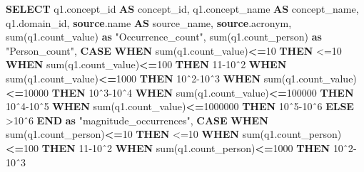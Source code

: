 \documentclass[
]{book}
\newenvironment{Shaded}{\begin{snugshade}}{\end{snugshade}}
\newcommand{\ControlFlowTok}[1]{\textcolor[rgb]{0.13,0.29,0.53}{\textbf{#1}}}
\newcommand{\DecValTok}[1]{\textcolor[rgb]{0.00,0.00,0.81}{#1}}
\newcommand{\FunctionTok}[1]{\textcolor[rgb]{0.00,0.00,0.00}{#1}}
\newcommand{\KeywordTok}[1]{\textcolor[rgb]{0.13,0.29,0.53}{\textbf{#1}}}
\newcommand{\NormalTok}[1]{#1}
\newcommand{\OperatorTok}[1]{\textcolor[rgb]{0.81,0.36,0.00}{\textbf{#1}}}
\newcommand{\OtherTok}[1]{\textcolor[rgb]{0.56,0.35,0.01}{#1}}
\newcommand{\StringTok}[1]{\textcolor[rgb]{0.31,0.60,0.02}{#1}}
\begin{document}
\begin{Shaded}
\begin{Highlighting}[]
\KeywordTok{SELECT}
\NormalTok{    q1.concept\_id }\KeywordTok{AS}\NormalTok{ concept\_id,}
\NormalTok{    q1.concept\_name }\KeywordTok{AS}\NormalTok{ concept\_name,}
\NormalTok{    q1.domain\_id,}
    \KeywordTok{source}\NormalTok{.name }\KeywordTok{AS}\NormalTok{ source\_name,}
    \KeywordTok{source}\NormalTok{.acronym,}
    \FunctionTok{sum}\NormalTok{(q1.count\_value) }\KeywordTok{as} \OtherTok{"Occurrence\_count"}\NormalTok{,}
    \FunctionTok{sum}\NormalTok{(q1.count\_person) }\KeywordTok{as} \OtherTok{"Person\_count"}\NormalTok{,}
    \ControlFlowTok{CASE} 
        \ControlFlowTok{WHEN} \FunctionTok{sum}\NormalTok{(q1.count\_value)}\OperatorTok{\textless{}=}\DecValTok{10} \ControlFlowTok{THEN} \StringTok{\textquotesingle{}\textless{}=10\textquotesingle{}}
        \ControlFlowTok{WHEN} \FunctionTok{sum}\NormalTok{(q1.count\_value)}\OperatorTok{\textless{}=}\DecValTok{100} \ControlFlowTok{THEN} \StringTok{\textquotesingle{}11{-}10ˆ2\textquotesingle{}}
        \ControlFlowTok{WHEN} \FunctionTok{sum}\NormalTok{(q1.count\_value)}\OperatorTok{\textless{}=}\DecValTok{1000} \ControlFlowTok{THEN} \StringTok{\textquotesingle{}10ˆ2{-}10ˆ3\textquotesingle{}}
        \ControlFlowTok{WHEN} \FunctionTok{sum}\NormalTok{(q1.count\_value)}\OperatorTok{\textless{}=}\DecValTok{10000} \ControlFlowTok{THEN} \StringTok{\textquotesingle{}10ˆ3{-}10ˆ4\textquotesingle{}}
        \ControlFlowTok{WHEN} \FunctionTok{sum}\NormalTok{(q1.count\_value)}\OperatorTok{\textless{}=}\DecValTok{100000} \ControlFlowTok{THEN} \StringTok{\textquotesingle{}10ˆ4{-}10ˆ5\textquotesingle{}}
        \ControlFlowTok{WHEN} \FunctionTok{sum}\NormalTok{(q1.count\_value)}\OperatorTok{\textless{}=}\DecValTok{1000000} \ControlFlowTok{THEN} \StringTok{\textquotesingle{}10ˆ5{-}10ˆ6\textquotesingle{}}
        \ControlFlowTok{ELSE} \StringTok{\textquotesingle{}\textgreater{}10ˆ6\textquotesingle{}}
    \ControlFlowTok{END} \KeywordTok{as} \OtherTok{"magnitude\_occurrences"}\NormalTok{,}
    \ControlFlowTok{CASE} 
        \ControlFlowTok{WHEN} \FunctionTok{sum}\NormalTok{(q1.count\_person)}\OperatorTok{\textless{}=}\DecValTok{10} \ControlFlowTok{THEN} \StringTok{\textquotesingle{}\textless{}=10\textquotesingle{}}
        \ControlFlowTok{WHEN} \FunctionTok{sum}\NormalTok{(q1.count\_person)}\OperatorTok{\textless{}=}\DecValTok{100} \ControlFlowTok{THEN} \StringTok{\textquotesingle{}11{-}10ˆ2\textquotesingle{}}
        \ControlFlowTok{WHEN} \FunctionTok{sum}\NormalTok{(q1.count\_person)}\OperatorTok{\textless{}=}\DecValTok{1000} \ControlFlowTok{THEN} \StringTok{\textquotesingle{}10ˆ2{-}10ˆ3\textquotesingle{}}

\end{Highlighting}
\end{Shaded}
\end{document}
